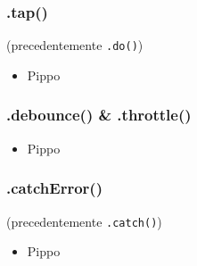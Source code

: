             \subsubsection{.tap()}\label{subsub:tap}

            \begin{frame}{\insertsubsectionhead}{}
                \begin{block}{\texttt{\insertsubsubsectionhead} (precedentemente \texttt{.do()})}
                    \begin{itemize}
                        \item Pippo
                    \end{itemize}
                \end{block}
            \end{frame}

            \subsubsection{.debounce() \& .throttle()}\label{subsub:debounce}

            \begin{frame}{\insertsubsectionhead}{}
                \begin{block}{\texttt{\insertsubsubsectionhead}}
                    \begin{itemize}
                        \item Pippo
                    \end{itemize}
                \end{block}
            \end{frame}

            \subsubsection{.catchError()}\label{subsub:catch}

            \begin{frame}{\insertsubsectionhead}{}
                \begin{block}{\texttt{\insertsubsubsectionhead} (precedentemente \texttt{.catch()})}
                    \begin{itemize}
                        \item Pippo
                    \end{itemize}
                \end{block}
            \end{frame}

